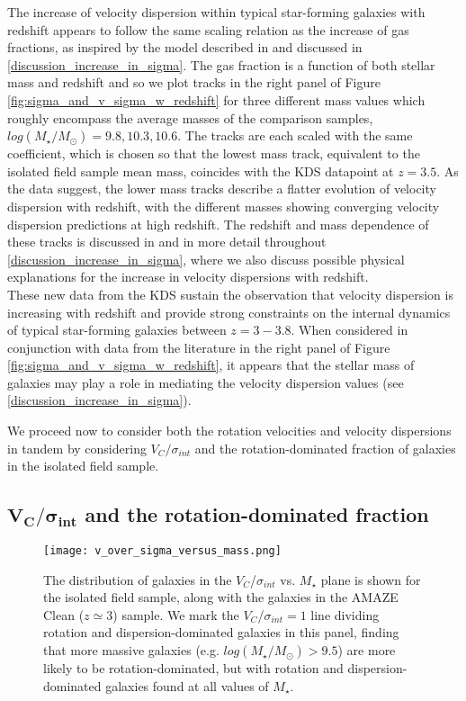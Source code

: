 \documentclass[fleqn,usenatbib]{mnras}
\begin{document}
The increase of velocity dispersion within typical star-forming galaxies with redshift appears to follow the same scaling relation as the increase of gas fractions, as inspired by the model described in \cite{Wisnioski2015} and discussed in \cref{discussion_increase_in_sigma}. 
The gas fraction is a function of both stellar mass and redshift and so we plot tracks in the right panel of Figure \ref{fig:sigma_and_v_sigma_w_redshift} for three different mass values which roughly encompass the average masses of the comparison samples, $log(M_{\star}/M_{\odot})=9.8,10.3,10.6$.
The tracks are each scaled with the same coefficient, which is chosen so that the lowest mass track, equivalent to the isolated field sample mean mass, coincides with the KDS datapoint at $z=3.5$.
As the data suggest, the lower mass tracks describe a flatter evolution of velocity dispersion with redshift, with the different masses showing converging velocity dispersion predictions at high redshift.  
The redshift and mass dependence of these tracks is discussed in \cite{Wisnioski2015} and in more detail throughout \cref{discussion_increase_in_sigma}, where we also discuss possible physical explanations for the increase in velocity dispersions with redshift. \\

\noindent
These new data from the KDS sustain the observation that velocity dispersion is increasing with redshift and provide strong constraints on the internal dynamics of typical star-forming galaxies between $z=3-3.8$.
When considered in conjunction with data from the literature in the right panel of Figure \ref{fig:sigma_and_v_sigma_w_redshift}, it appears that the stellar mass of galaxies may play a role in mediating the velocity dispersion values (see \cref{discussion_increase_in_sigma}).

We proceed now to consider both the rotation velocities and velocity dispersions in tandem by considering $V_{C}/\sigma_{int}$ and the rotation-dominated fraction of galaxies in the isolated field sample.

\subsection{$\boldsymbol{V_{C}/\sigma_{int}}$ and the rotation-dominated fraction}\label{subsec:rdf_v_over_sigma}

\begin{figure}
    \centering \hspace{-1.13cm}
    \texttt{[image: v\_over\_sigma\_versus\_mass.png]}
    \caption{The distribution of galaxies in the $V_{C}$/$\sigma_{int}$ vs. $M_{\star}$ plane is shown for the isolated field sample, along with the galaxies in the AMAZE Clean ($z\simeq3$) sample.
    We mark the $V_{C}$/$\sigma_{int}=1$ line dividing rotation and dispersion-dominated galaxies in this panel, finding that more massive galaxies (e.g. $log(M_{\star}/M_{\odot}) > 9.5$) are more likely to be rotation-dominated, but with rotation and dispersion-dominated galaxies found at all values of $M_{\star}$.}
    \label{fig:v_sig_and_v}
\end{figure}
\end{document}
